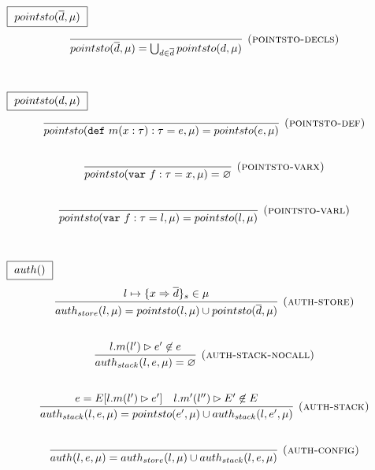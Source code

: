 \documentclass{llncs}
\newcommand{\keywadj}[1]{\mathtt{#1}}
\newcommand{\keyw}[1]{\keywadj{#1}~}
\begin{document}
$\fbox{$~pointsto(\overline{d}, \mu)~$}$
\[
\begin{array}{c}
\infer[\textsc{(pointsto-decls)}]
  {pointsto(\overline{d}, \mu) = \bigcup_{d \in \overline{d}} pointsto(d, \mu)}
  {}\\[5ex]
  
\end{array}
\]

$\fbox{$~pointsto(d, \mu)~$}$
\[
\begin{array}{c}

\infer[\textsc{(pointsto-def)}]
  {pointsto(\keyw{def} m(x:\tau):\tau = e, \mu) = pointsto(e, \mu)}
  {}\\[5ex]
  
\infer[\textsc{(pointsto-varx)}]
  {pointsto(\keyw{var} f:\tau = x,\mu) = \varnothing}
  {}\\[5ex]
\infer[\textsc{(pointsto-varl)}]
  {pointsto(\keyw{var} f:\tau = l,\mu) = pointsto(l,\mu)}
  {}\\[5ex]

\end{array}
\]

$\fbox{$~auth()~$}$
\[
\begin{array}{c}
\infer[\textsc{(auth-store)}]
  {auth_{store}(l,\mu) = pointsto(l, \mu) \cup pointsto(\overline{d},\mu)}
  {l \mapsto \{ x \Rightarrow \overline{d} \}_{s} \in \mu}\\[5ex]

\infer[\textsc{(auth-stack-nocall)}]
  {auth_{stack}(l, e, \mu) = \varnothing}
  {l.m(l') \rhd e' \not\in e}\\[5ex]
\infer[\textsc{(auth-stack)}]
  {auth_{stack}(l, e, \mu) = pointsto(e',\mu) \cup auth_{stack}(l,e',\mu)}
  {e = E[l.m(l') \rhd e'] & l.m'(l'') \rhd E' \not\in E}\\[5ex]
  
\infer[\textsc{(auth-config)}]
  {auth(l,e, \mu) = auth_{store}(l,\mu) \cup auth_{stack}(l,e,\mu)}
  {}\\[5ex]

\end{array}
\]
\end{document}
